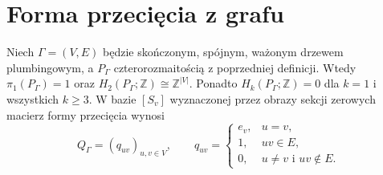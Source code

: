 \section{Forma przecięcia z grafu}
\label{sec:tg-plumbing-Q}

\begin{twierdzenie}
\label{thm:tg-plumbing-intersection}
Niech $\Gamma=(V,E)$ będzie skończonym, spójnym, ważonym
drzewem plumbingowym, a $P_\Gamma$ czterorozmaitością
z poprzedniej definicji. Wtedy $\pi_1(P_\Gamma)=1$ oraz
$H_2(P_\Gamma;\mathbb Z)\cong\mathbb Z^{|V|}$.
Ponadto $H_k(P_\Gamma;\mathbb Z)=0$ dla $k=1$
i wszystkich $k\ge3$.
W bazie $[S_v]$ wyznaczonej przez obrazy sekcji zerowych
macierz formy przecięcia wynosi
\[
Q_\Gamma=(q_{uv})_{u,v\in V},\qquad
q_{uv}=\begin{cases}
e_v,&u=v,\\
1,&uv\in E,\\
0,&u\ne v\text{ i }uv\notin E.
\end{cases}
\]
\end{twierdzenie}

